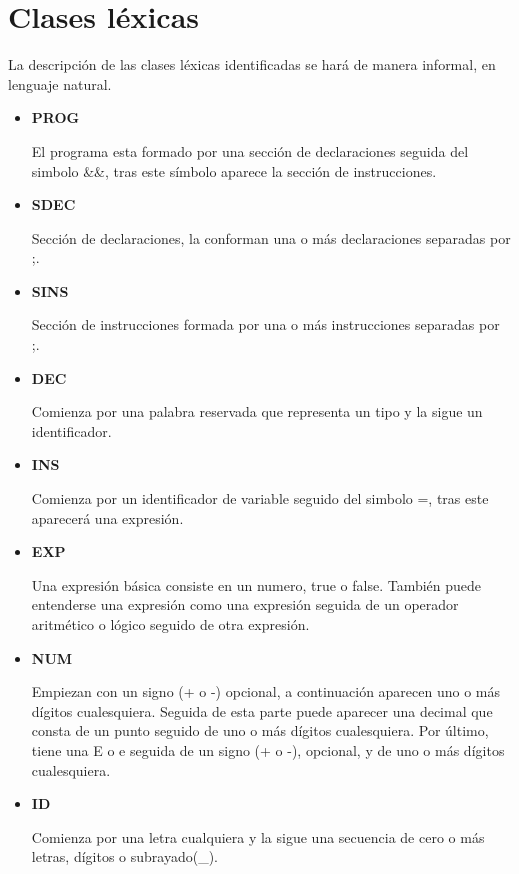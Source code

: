 \documentclass[\main/MemoriaPL.tex]{subfiles}
\begin{document}
  \section{Clases léxicas}
    \par
    La descripción de las clases léxicas identificadas se hará de manera informal, en lenguaje natural.

    \begin{itemize}
      \item \textbf{PROG}
            \par
            El programa esta formado por una sección de declaraciones seguida del simbolo \&\&, tras este símbolo aparece
            la sección de instrucciones.
      \item \textbf{SDEC}
            \par
            Sección de declaraciones, la conforman una o más declaraciones separadas por ;.
      \item \textbf{SINS}
            \par
            Sección de instrucciones formada por una o más instrucciones separadas por ;.
      \item \textbf{DEC}
            \par
            Comienza por una palabra reservada que representa un tipo y la sigue un identificador.
      \item \textbf{INS}
            \par
            Comienza por un identificador de variable seguido del simbolo =, tras este aparecerá una expresión.
      \item \textbf{EXP}
            \par
            Una expresión básica consiste en un numero, true o false. También puede entenderse una expresión como
            una expresión seguida de un operador aritmético o lógico seguido de otra expresión.
      \item \textbf{NUM}
            \par
            Empiezan con un signo (+ o -) opcional, a continuación aparecen uno o más dígitos cualesquiera.
            Seguida de esta parte puede aparecer una decimal que consta de un punto seguido de uno o más dígitos cualesquiera.
            Por último, tiene una E o e seguida de un signo (+ o -), opcional, y de uno o más dígitos cualesquiera.
      \item \textbf{ID}
            \par
            Comienza por una letra cualquiera y la sigue una secuencia de cero o más letras, dígitos o subrayado(\_).

\end{itemize}
\end{document}

